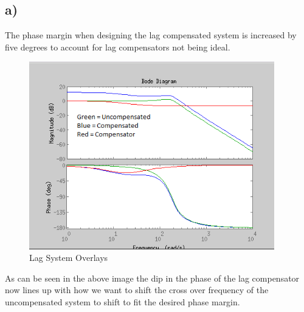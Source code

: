 \documentclass{article}
\begin{document}
\subsection{a)} %
\label{sub:a_}
The phase margin when designing the lag compensated system is increased by five degrees to account for lag compensators not being ideal.
\begin{figure}[!htbp]
    \centering
    \includegraphics[width=0.95\textwidth]{lag_overlays.png}
    \caption{Lag System Overlays}
\end{figure}
As can be seen in the above image the dip in the phase of the lag compensator now lines up with how we want to shift the cross over frequency of the uncompensated system to shift to fit the desired phase margin.

\newpage
\end{document}
